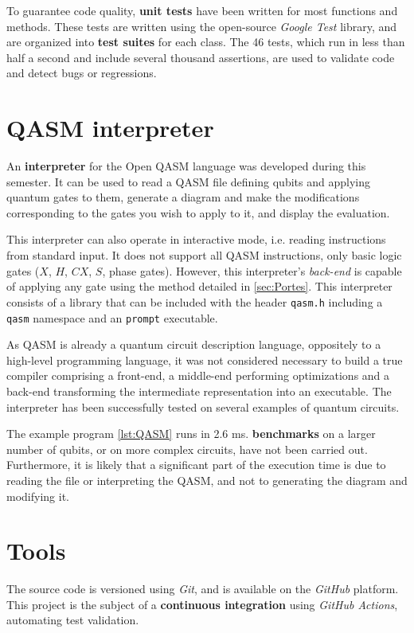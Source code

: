 To guarantee code quality, \textbf{unit tests} have been written for most functions and methods. These tests are written using the open-source \textit{Google Test} library, and are organized into \textbf{test suites} for each class. \cite{GoogleTest} The 46 tests, which run in less than half a second and include several thousand assertions, are used to validate code and detect bugs or regressions.

\section{QASM interpreter}

An \textbf{interpreter} for the Open QASM language was developed during this semester. It can be used to read a QASM file defining qubits and applying quantum gates to them, generate a diagram and make the modifications corresponding to the gates you wish to apply to it, and display the evaluation.

This interpreter can also operate in interactive mode, i.e. reading instructions from standard input. It does not support all QASM instructions, only basic logic gates ($X$, $H$, $CX$, $S$, phase gates). However, this interpreter's \textit{back-end} is capable of applying any gate using the method detailed in \autoref{sec:Portes}. This interpreter consists of a library that can be included with the header \texttt{qasm.h} including a \texttt{qasm} namespace and an \texttt{prompt} executable.

As QASM is already a quantum circuit description language, oppositely to a high-level programming language, it was not considered necessary to build a true compiler comprising a front-end, a middle-end performing optimizations and a back-end transforming the intermediate representation into an executable. The interpreter has been successfully tested on several examples of quantum circuits.

The example program \ref{lst:QASM} runs in 2.6 ms. \textbf{benchmarks} on a larger number of qubits, or on more complex circuits, have not been carried out. Furthermore, it is likely that a significant part of the execution time is due to reading the file or interpreting the QASM, and not to generating the diagram and modifying it.

\section{Tools}

The source code is versioned using \textit{Git}, and is available on the \textit{GitHub} platform. \cite{Git} \cite{GitHub} \cite{Leroy_2025} This project is the subject of a \textbf{continuous integration} using \textit{GitHub Actions}, automating test validation.

